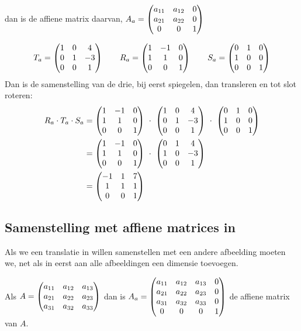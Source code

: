 {dan is de affiene matrix daarvan, $A_a = \begin{pmatrix} a_{11} & a_{12} & 0 \\ a_{21} & a_{22} & 0 \\ 0 & 0 & 1 \end{pmatrix} $}

\[
    T_a = \begin{pmatrix} 1&0&4 \\ 0&1&-3 \\ 0&0&1 \end{pmatrix} \qquad 
    R_a = \begin{pmatrix} 1&-1&0 \\ 1&1&0 \\ 0&0&1 \end{pmatrix} \qquad
    S_a = \begin{pmatrix} 0&1&0 \\ 1&0&0 \\ 0&0&1 \end{pmatrix}
\]
Dan is de samenstelling van de drie, bij eerst spiegelen, dan transleren en tot slot roteren:
\begin{align*} 
    R_a \cdot T_a \cdot S_a & = \matdrie{1&-1&0}{1&1&0}{0&0&1} \ \cdot\ 
                                \matdrie{1&0&4}{0&1&-3}{0&0&1} \ \cdot\ 
                                \matdrie{0&1&0}{1&0&0}{0&0&1} \\
       &= \matdrie{1&-1&0}{1&1&0}{0&0&1} \ \cdot\ \matdrie{0&1&4}{1&0&-3}{0&0&1} \\
       &= \matdrie{-1&1&7}{1&1&1}{0&0&1}   
\end{align*} 

\subsection{Samenstelling met affiene matrices in \RD}
Als we een translatie in \RD willen samenstellen met een andere afbeelding moeten we, net als in \RT eerst aan alle afbeeldingen een dimensie toevoegen. 

\mydeftekst{affiene matrix} {
	Als $A = \begin{pmatrix} a_{11}&a_{12}&a_{13} \\ a_{21}&a_{22}& a_{23} \\ a_{31}&a_{32}&a_{33} \end{pmatrix} $ 
	dan is $A_a = \begin{pmatrix} a_{11}&a_{12}&a_{13}&0 \\ a_{21}&a_{22}&a_{23}&0 \\ a_{31}&a_{32}&a_{33}&0 \\ 0&0&0&1 \end{pmatrix} $ de affiene matrix van $A$. 
} 
                        
